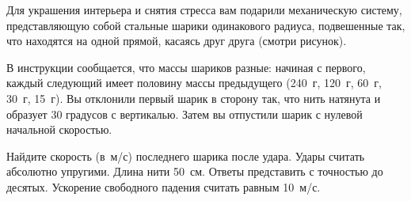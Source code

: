 
Для украшения интерьера и снятия стресса вам подарили механическую систему, 
представляющую собой стальные шарики одинакового радиуса, подвешенные так, что 
находятся на одной прямой, касаясь друг друга (смотри рисунок).


В инструкции сообщается, что массы шариков разные: начиная с первого, каждый следующий имеет 
половину массы предыдущего (240~г, 120~г, 60~г, 30~г, 15~г). Вы отклонили первый шарик в сторону так, 
что нить натянута и образует 30 градусов с вертикалью. Затем вы отпустили шарик с 
нулевой начальной скоростью.

Найдите скорость (в~м/с) последнего шарика после удара. Удары считать абсолютно упругими. Длина нити 50~см. 
Ответы представить с точностью до десятых. Ускорение свободного падения считать равным 10~м/с.

